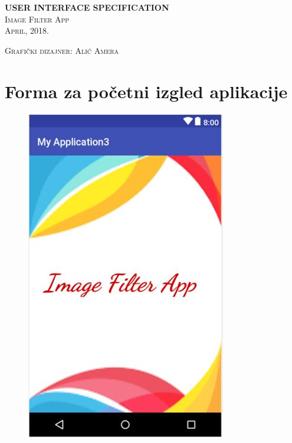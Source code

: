 \documentclass[12pt]{scrreprt}
\begin{document}
	\begin{titlepage}
		\begin{center}
			\vspace*{10cm}
			\huge{\bfseries{USER INTERFACE SPECIFICATION}}\\
			[2mm]
			\textsc{\LARGE Image Filter App}\\
			[2mm]
			\textsc{\Large April, 2018.}\\
			[3cm]
		\end{center}
		\begin{flushleft}
			\textsc{Grafički dizajner: Alić Amera}
		\end{flushleft}
	\end{titlepage}

\tableofcontents  %

\chapter{Forma za početni izgled aplikacije}

\begin{figure}[h]
	\begin{Center}
		\includegraphics{image2}
	\end{Center}
\end{figure}
\end{document}
